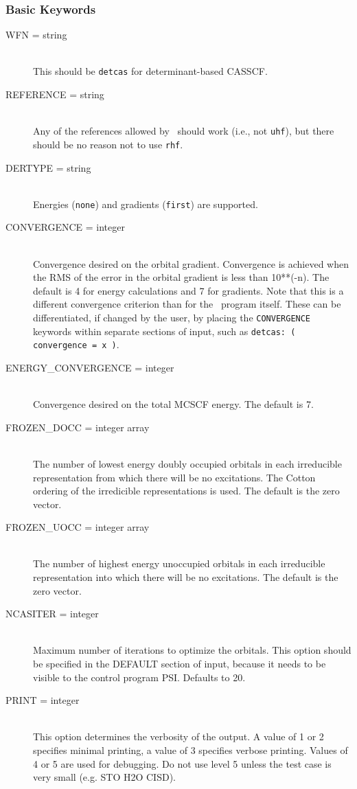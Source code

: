 \subsubsection{Basic Keywords}
\begin{description}
\item[WFN = string]\mbox{}\\
This should be {\tt detcas} for determinant-based CASSCF.
\item[REFERENCE = string]\mbox{}\\
Any of the references allowed by \PSIdetci\ should work (i.e., not 
{\tt uhf}), but there should be no reason not to use {\tt rhf}.
\item[DERTYPE = string]\mbox{}\\
Energies ({\tt none}) and gradients ({\tt first}) are supported.
\item[CONVERGENCE = integer]\mbox{}\\
Convergence desired on the orbital gradient.  Convergence is achieved when
the RMS of the error in the orbital gradient is less than 10**(-n).  The 
default is 4 for energy calculations and 7 for gradients.  Note that
this is a different convergence criterion than for the \PSIdetci\
program itself.  These can be differentiated, if changed by the user,
by placing the {\tt CONVERGENCE} keywords within separate sections of
input, such as {\tt detcas: ( convergence = x )}.
\item[ENERGY\_CONVERGENCE = integer]\mbox{}\\
Convergence desired on the total MCSCF energy.  The default is 7.
\item[FROZEN\_DOCC = integer array]\mbox{}\\
The number of lowest energy doubly occupied orbitals in each irreducible
representation from which there will be no excitations.
The Cotton ordering of the irredicible representations is used.
The default is the zero vector.
\item[FROZEN\_UOCC = integer array]\mbox{}\\
The number of highest energy unoccupied orbitals in each irreducible
representation into which there will be no excitations.
The default is the zero vector.
\item[NCASITER = integer]\mbox{}\\
Maximum number of iterations to optimize the orbitals.  This option
should be specified in the DEFAULT section of input, because
it needs to be visible to the control program PSI.  Defaults to 20.
\item[PRINT = integer]\mbox{}\\
This option determines the verbosity of the output.  A value of 1 or
2 specifies minimal printing, a value of 3 specifies verbose printing.
Values of 4 or 5 are used for debugging.  Do not use level 5 unless
the test case is very small (e.g. STO H2O CISD).
\end{description}

